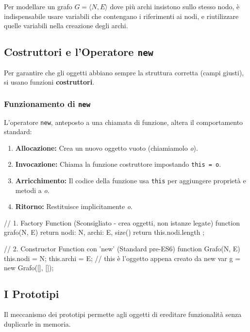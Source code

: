 Per modellare un grafo $G=\langle N,E\rangle$ dove più archi insistono sullo stesso nodo, è indispensabile usare variabili che contengano i riferimenti ai nodi, e riutilizzare quelle variabili nella creazione degli archi.

\subsection{Costruttori e l'Operatore \texttt{new}}
Per garantire che gli oggetti abbiano sempre la struttura corretta (campi giusti), si usano funzioni \textbf{costruttori}.

\subsubsection{Funzionamento di \texttt{new}}
L'operatore \texttt{new}, anteposto a una chiamata di funzione, altera il comportamento standard:
\begin{enumerate}
    \item \textbf{Allocazione:} Crea un nuovo oggetto vuoto (chiamiamolo \textit{o}).
    \item \textbf{Invocazione:} Chiama la funzione costruttore impostando \texttt{this = o}.
    \item \textbf{Arricchimento:} Il codice della funzione usa \texttt{this} per aggiungere proprietà e metodi a \textit{o}.
    \item \textbf{Ritorno:} Restituisce implicitamente \textit{o}.
\end{enumerate}

\begin{jsbox}[title={Confronto Costruttori}]
// 1. Factory Function (Sconsigliato - crea oggetti, non istanze legate)
function grafo(N, E) {
    return { nodi: N, archi: E, size() { return this.nodi.length } };
}

// 2. Constructor Function con 'new' (Standard pre-ES6)
function Grafo(N, E) {
    this.nodi = N;
    this.archi = E;
    // this è l'oggetto appena creato da new
}
var g = new Grafo([], []);
\end{jsbox}

\subsection{I Prototipi}
Il meccanismo dei prototipi permette agli oggetti di ereditare funzionalità senza duplicarle in memoria.


